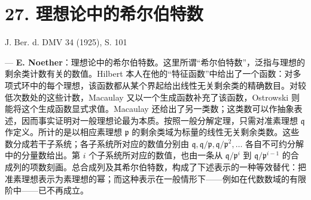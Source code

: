 \documentclass[11pt]{article}
\begin{document}
\section*{27. 理想论中的希尔伯特数}

\begin{center}
J. Ber. d. DMV 34 (1925), S. 101
\end{center}

--- \textbf{E. Noether}：理想论中的希尔伯特数。这里所谓“希尔伯特数”，泛指与理想的剩余类计数有关的数值。Hilbert 本人在他的“特征函数”中给出了一个函数：对多项式环中的每个理想，该函数都从某个界起给出线性无关剩余类的精确数目。对较低次数处的这些计数，Macaulay 又以一个生成函数补充了该函数，Ostrowski 则能将这个生成函数显式求值。Macaulay 还给出了另一类数；这类数可以作抽象表述，因而事实证明对一般理想论最为本质。按照一般分解定理，只需对准素理想 $\mathfrak q$ 作定义。所计的是以相应素理想 $\mathfrak p$ 的剩余类域为标量的线性无关剩余类数。这些数分成若干子系统；各子系统所对应的数值分别由 $\mathfrak q,\mathfrak q/\mathfrak p,\mathfrak q/\mathfrak p^2,\ldots$ 各自不可约分解中的分量数给出。第 $i$ 个子系统所对应的数值，也由一条从 $\mathfrak q/\mathfrak p^i$ 到 $\mathfrak q/\mathfrak p^{i-1}$ 的合成列的项数刻画。总合成列及其希尔伯特数，构成了下述表示的一种等效替代：把准素理想表示为素理想的幂；而这种表示在一般情形下——例如在代数数域的有限阶中——已不再成立。
\end{document}
